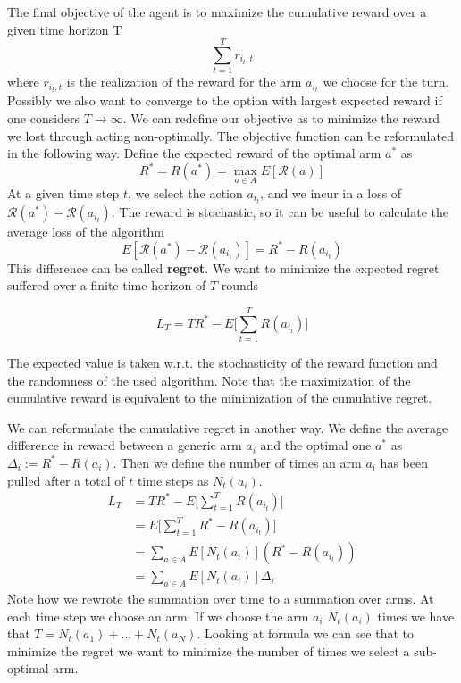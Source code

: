 \documentclass[../main.tex]{subfiles}
\begin{document}
The final objective of the agent is to maximize the cumulative reward over a
given time horizon T
\begin{equation*}
    \sum_{t=1}^T r_{{i_t},t}
\end{equation*}
where $r_{{i_t},t}$ is the realization of the reward for the arm $a_{i_t}$ we choose for the turn. Possibly we also want to converge to the option with largest expected reward if one considers $T \rightarrow \infty$. We can redefine our objective as to minimize the reward we lost through acting non-optimally. The objective function can be reformulated in the following way. Define the expected reward of the optimal arm $a^*$ as
\begin{equation*}
    R^* = R(a^*) = \max_{a \in A} E[\mathcal{R}(a)]
\end{equation*}
At a given time step $t$, we select the action $a_{i_t}$, and we incur in a loss of $\mathcal{R}(a^*) - \mathcal{R}(a_{i_t})$. The reward is stochastic, so it can be useful to calculate the average loss of the algorithm
\begin{equation*}
    E[\mathcal{R}(a^*) - \mathcal{R}(a_{i_t})] = R^* - R(a_{i_t})
\end{equation*}
This difference can be called \textbf{regret}.
We want to minimize the expected regret suffered over a finite time horizon of $T$ rounds
\begin{definition}
    \begin{equation*}
        L_T = TR^* - E \bigg[ \sum_{t=1}^T R(a_{i_t}) \bigg]
    \end{equation*}
\end{definition}
\par \noindent
The expected value is taken w.r.t. the stochasticity of the reward function and the randomness of the used algorithm. Note that the maximization of the cumulative reward is equivalent to the minimization of the cumulative regret.

We can reformulate the cumulative regret in another way.
We define the average difference in reward between a generic arm $a_i$ and the optimal one $a^*$ as $\Delta_i := R^*-R(a_i)$. Then we define the number of times an arm $a_i$ has been pulled after a total of $t$ time steps as $N_t(a_i)$.
\begin{align*}
    L_T & = TR^* - E \bigg[ \sum_{t=1}^T R(a_{i_t}) \bigg] \\
        & = E \bigg[ \sum_{t=1}^T R^* - R(a_{i_t}) \bigg]  \\
        & = \sum_{a \in A} E[N_t(a_i)](R^* - R(a_{i_t}))   \\
        & = \sum_{a \in A} E[N_t(a_i)] \Delta_i
\end{align*}
Note how we rewrote the summation over time to a summation over arms. At each time step we choose an arm. If we choose the arm $a_i$ $N_t(a_i)$ times we have that $T= N_t(a_1) + \dots + N_t(a_N)$. Looking at formula we can see that to minimize the regret we want to minimize the number of times we select a sub-optimal arm.
\end{document}
